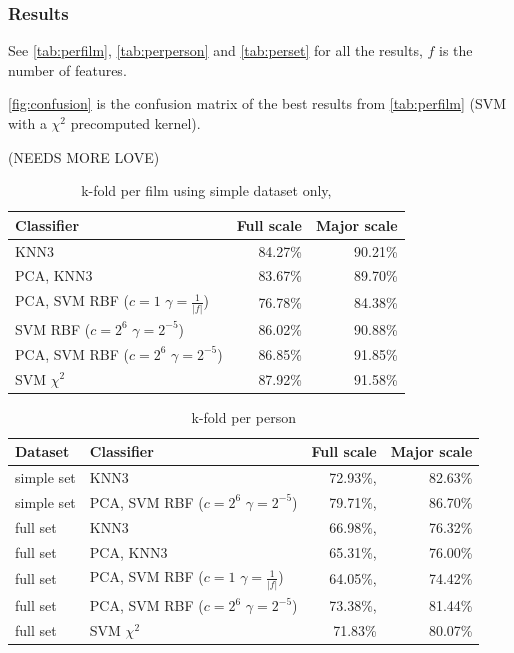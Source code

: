 \subsubsection{Results}
See \autoref{tab:perfilm}, \autoref{tab:perperson} and \autoref{tab:perset} for all the results, $f$ is the number of features.

\autoref{fig:confusion} is the confusion matrix of the best results from \autoref{tab:perfilm} (SVM with a $\chi^2$ precomputed kernel).

(NEEDS MORE LOVE)


\begin{table}
\centering
\begin{tabular}{lrr}
\hline\hline
Classifier 				&  	Full scale	& Major scale	\\
\hline
KNN3 		&  	84.27\%		& 90.21\%		\\
PCA, KNN3 	& 	83.67\%		& 89.70\%		\\
PCA, SVM RBF ($c=1$ $\gamma=\frac{1}{|f|}$)	& 	76.78\%		& 84.38\%		\\
SVM RBF ($c=2^6$ $\gamma=2^{-5}$) & 86.02\% & 90.88\% \\
PCA, SVM RBF ($c=2^6$ $\gamma=2^{-5}$) &  86.85\% & 91.85\% \\
SVM $\chi^2$ & 87.92\% 		& 91.58\% \\
\hline
\end{tabular}
\caption{k-fold per film using simple dataset only,}
\label{tab:perfilm}
\end{table}


\begin{table}
\centering
\begin{tabular}{llrr}
\hline\hline
Dataset & Classifier 				&  	Full scale	& Major scale	\\
\hline
simple set	& KNN3	& 72.93\%, & 82.63\%	\\
simple set	& PCA, SVM RBF ($c=2^6$ $\gamma=2^{-5}$) & 79.71\%, & 86.70\%	\\
full set	& KNN3 & 66.98\%, & 76.32\%	\\
full set	& PCA, KNN3 & 65.31\%, & 76.00\%	\\
full set	& PCA, SVM RBF ($c=1$ $\gamma=\frac{1}{|f|}$) & 64.05\%, & 74.42\%	\\
full set	& PCA, SVM RBF ($c=2^6$ $\gamma=2^{-5}$)& 73.38\%, & 81.44\%	\\
full set    & SVM $\chi^2$ &  71.83\% &80.07\% \\
\hline
\end{tabular}
\caption{k-fold per person}
\label{tab:perperson}
\end{table}


